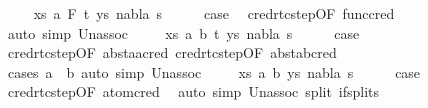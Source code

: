 \begin{isabellebody}
\isamarkupfalse%
\isanewline
\ \ \isamarkupfalse%
\ {\isacharparenleft}{\kern0pt}{}\ xs\ a\ F\ t\ ys\ nabla\ s{\isacharparenright}{\kern0pt}\isanewline
\ \ \isamarkupfalse%
\ \isamarkupfalse%
\ {\isacharquery}{\kern0pt}case\ \isamarkupfalse%
\ cred{\isacharunderscore}{\kern0pt}rtc{\isacharunderscore}{\kern0pt}step{\isacharbrackleft}{\kern0pt}OF\ func{\isacharunderscore}{\kern0pt}cred{\isacharbrackright}{\kern0pt}\ \isamarkupfalse%
\ {\isacharparenleft}{\kern0pt}auto\ simp{\isacharcolon}{\kern0pt}\ Un{\isacharunderscore}{\kern0pt}assoc{\isacharparenright}{\kern0pt}\isanewline
{}\isamarkupfalse%
\isanewline
\ \ \isamarkupfalse%
\ {\isacharparenleft}{\kern0pt}{}\ xs\ a\ b\ t\ ys\ nabla\ s{\isacharparenright}{\kern0pt}\isanewline
\ \ \isamarkupfalse%
\ \isamarkupfalse%
\ {\isacharquery}{\kern0pt}case\ \isanewline
\ \ \ \ \isamarkupfalse%
\ cred{\isacharunderscore}{\kern0pt}rtc{\isacharunderscore}{\kern0pt}step{\isacharbrackleft}{\kern0pt}OF\ abst{\isacharunderscore}{\kern0pt}aa{\isacharunderscore}{\kern0pt}cred{\isacharbrackright}{\kern0pt}\ cred{\isacharunderscore}{\kern0pt}rtc{\isacharunderscore}{\kern0pt}step{\isacharbrackleft}{\kern0pt}OF\ abst{\isacharunderscore}{\kern0pt}ab{\isacharunderscore}{\kern0pt}cred{\isacharbrackright}{\kern0pt}\isanewline
\ \ \ \ \isamarkupfalse%
\ {\isacharparenleft}{\kern0pt}cases\ {\isachardoublequoteopen}a\ {\isacharequal}{\kern0pt}\ b{\isachardoublequoteclose}{\isacharparenright}{\kern0pt}\ {\isacharparenleft}{\kern0pt}auto\ simp{\isacharcolon}{\kern0pt}\ Un{\isacharunderscore}{\kern0pt}assoc{\isacharparenright}{\kern0pt}\isanewline
{}\isamarkupfalse%
\isanewline
\ \ \isamarkupfalse%
\ {\isacharparenleft}{\kern0pt}{}\ xs\ a\ b\ ys\ nabla\ s{\isacharparenright}{\kern0pt}\isanewline
\ \ \isamarkupfalse%
\ \isamarkupfalse%
\ {\isacharquery}{\kern0pt}case\ \isamarkupfalse%
\ cred{\isacharunderscore}{\kern0pt}rtc{\isacharunderscore}{\kern0pt}step{\isacharbrackleft}{\kern0pt}OF\ atom{\isacharunderscore}{\kern0pt}cred{\isacharbrackright}{\kern0pt}\ \isamarkupfalse%
\ {\isacharparenleft}{\kern0pt}auto\ simp{\isacharcolon}{\kern0pt}\ Un{\isacharunderscore}{\kern0pt}assoc\ split{\isacharcolon}{\kern0pt}\ if{\isacharunderscore}{\kern0pt}splits{\isacharparenright}{\kern0pt}\isanewline

\end{isabellebody}
